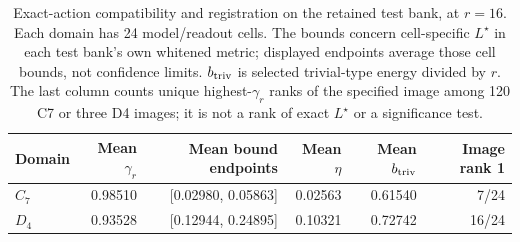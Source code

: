\begin{table}[t]
\centering\small
\begin{tabular}{@{}lrrrrr@{}}
\toprule
Domain & Mean $\gamma_r$ & Mean bound endpoints & Mean $\eta$ & Mean $b_{\rm triv}$ & Image rank 1 \\
\midrule
$C_7$ & 0.98510 & [0.02980, 0.05863] & 0.02563 & 0.61540 & 7/24 \\
$D_4$ & 0.93528 & [0.12944, 0.24895] & 0.10321 & 0.72742 & 16/24 \\
\bottomrule
\end{tabular}
\caption{Exact-action compatibility and registration on the retained test bank, at $r=16$. Each domain has 24 model/readout cells. The bounds concern cell-specific $L^\star$ in each test bank's own whitened metric; displayed endpoints average those cell bounds, not confidence limits. $b_{\rm triv}$ is selected trivial-type energy divided by $r$. The last column counts unique highest-$\gamma_r$ ranks of the specified image among 120 C7 or three D4 images; it is not a rank of exact $L^\star$ or a significance test.}
\label{tab:followup-spectral}
\end{table}

